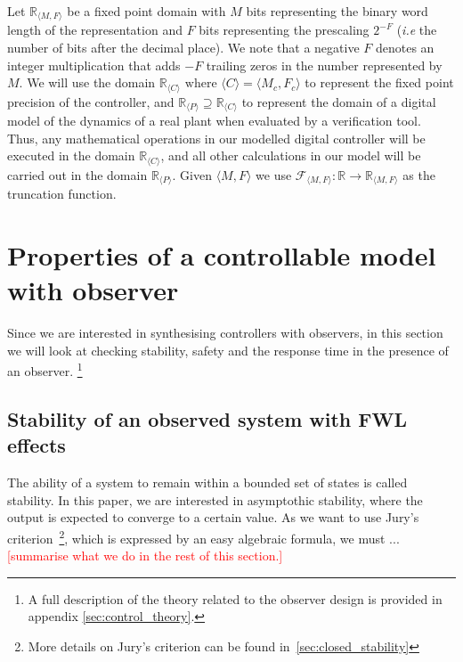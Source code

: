 \documentclass[sigconf]{llncs}
\renewcommand{\note}[1]{\textcolor{red}{[#1]}}
\begin{document}
Let $\mathbb{R}_{\langle M,F \rangle}$ be a fixed point domain with $M$ bits
representing the binary word length of the representation and $F$ bits
representing the prescaling $2^{-F}$ (\emph{i.e} the number of bits after
the decimal place).  We note that a negative $F$ denotes an integer
multiplication that adds $-F$ trailing zeros in the number represented by
$M$. 
We will use the domain $\mathbb{R}_{\langle C \rangle} \text{ where } \langle C \rangle = \langle M_c,F_c \rangle$
to represent the fixed point precision of the controller, and 
$\mathbb{R}_{\langle P \rangle} \supseteq \mathbb{R}_{\langle C \rangle}$
to represent the domain of a digital model of the dynamics of a real plant when
evaluated by a verification tool.
Thus, any mathematical operations in our modelled digital controller will be executed in the
domain $\mathbb{R}_{\langle C \rangle}$, and all other calculations
in our model will be carried out in the domain $\mathbb{R}_{\langle P \rangle}$.
Given ${\langle M,F \rangle}$ we use $\mathcal{F}_{\langle M,F \rangle} : \mathbb{R} \rightarrow \mathbb{R}_{\langle M,F \rangle}$ as the truncation function.

\section{Properties of a controllable model with observer}\label{sec:cof_verification}

Since we are interested in synthesising controllers with observers, 
in this section we will look at checking stability, safety and the response time in the presence of an observer. \footnote{A full description of
the theory related to the observer design is provided in appendix \ref{sec:control_theory}.}

\subsection{Stability of an observed system with FWL effects}\label{sec:cof_fwl_stability}

The ability of a system to remain within a bounded set of states is called stability.
In this paper, we are interested in
asymptothic stability, where the output is expected to
converge to a certain value. %
As we want to use Jury's criterion~\cite{fadali}\footnote{More details on Jury's criterion can be found in~\ref{sec:closed_stability}}, which is expressed 
by an easy algebraic formula, we must ... \note{summarise what we do in the rest of this section.}
\end{document}
